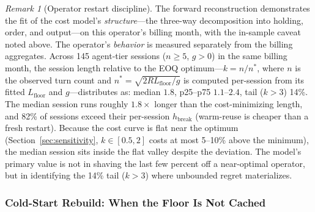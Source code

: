 \documentclass[11pt]{article}
\theoremstyle{definition}
\theoremstyle{remark}
\newtheorem{remark}[theorem]{Remark}
\begin{document}
\begin{remark}[Operator restart discipline]
The forward reconstruction demonstrates the fit of the cost model's \emph{structure}---the three-way decomposition into holding, order, and output---on this operator's billing month, with the in-sample caveat noted above. The operator's \emph{behavior} is measured separately from the billing aggregates. Across 145 agent-tier sessions ($n \ge 5$, $g > 0$) in the same billing month, the session length relative to the EOQ optimum---$k = n / n^*$, where $n$ is the observed turn count and $n^* = \sqrt{2 R L_{\text{floor}} / g}$ is computed per-session from its fitted $L_{\text{floor}}$ and $g$---distributes as: median $1.8$, p25--p75 $1.1$--$2.4$, tail ($k > 3$) 14\%. The median session runs roughly $1.8\times$ longer than the cost-minimizing length, and 82\% of sessions exceed their per-session $h_{\text{break}}$ (warm-reuse is cheaper than a fresh restart). Because the cost curve is flat near the optimum (Section~\ref{sec:sensitivity}, $k \in [0.5, 2]$ costs at most 5--10\% above the minimum), the median session sits inside the flat valley despite the deviation. The model's primary value is not in shaving the last few percent off a near-optimal operator, but in identifying the 14\% tail ($k > 3$) where unbounded regret materializes.
\end{remark}

\subsubsection{Cold-Start Rebuild: When the Floor Is Not Cached}
\end{document}

